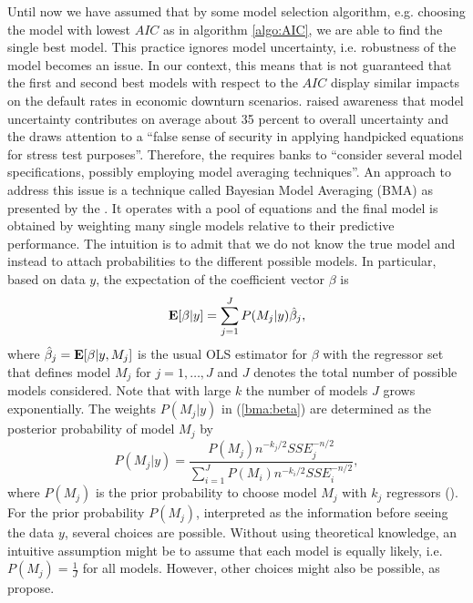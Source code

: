 \documentclass[a4paper, 12pt]{scrreprt}
\newcommand{\ew}{\mbox{\textbf{E}}}
\begin{document}
Until now we have assumed that by some model selection algorithm, e.g. choosing the model with lowest $AIC$ as in algorithm \ref{algo:AIC}, we are able to find the single best model. This practice ignores model uncertainty, i.e. robustness of the model becomes an issue. In our context, this means that is not guaranteed that the first and second best models with respect to the $AIC$ display similar impacts on the default rates in economic downturn scenarios. 
 \textcite{gross2017implications} raised awareness that model uncertainty contributes on average about 35 percent to overall uncertainty and the \textcite{ecb2015handpicked} draws attention to a ``false sense of security in applying handpicked equations for stress test purposes''.
 Therefore, the \textcite[chapter 
 2.3.1.5.v]{ecb2018srep} requires banks to ``consider several model specifications, possibly employing model averaging techniques''. An approach to address this issue is a technique called Bayesian Model Averaging (BMA) as presented by the \textcite[chapter 4.1]{ecb2017stampe}. 
It operates with a pool of equations and the final model is obtained by weighting many single models relative to their predictive performance.
The intuition is to admit that we do not know the true model and instead to attach probabilities to the different possible models.
In particular, based on data $y$, the expectation of the coefficient vector $\beta$ is 
\begin{equation}\label{bma:beta}
\ew[\beta | y] = \sum_{j=1}^{J} P(M_j | y) \hat{\beta}_j,
\end{equation}
where $\hat{\beta}_j = \ew[\beta | y, M_j]$ is the usual OLS estimator for $\beta$ with the regressor set that defines model $M_j$ for $j=1,\ldots,J$ and $J$ denotes the total number of possible models considered. Note that with large $k$ the number of models $J$ grows exponentially.
The weights $P(M_j | y)$ in (\ref{bma:beta}) are determined as the posterior probability of model $M_j$ by
\begin{equation}
P(M_j | y) = \frac{P(M_j) n^{-k_j/2} SSE_j^{-n/2}}{\sum_{i=1}^{J} P(M_i) n^{-k_i/2} SSE_i^{-n/2}},
\end{equation}
where $P(M_j)$ is the prior probability to choose model $M_j$ with $k_j$ regressors
(\textcite[chapter I.B]{doppelhofer2004determinants}).
For the prior probability $P(M_j)$, interpreted as the information before seeing the data $y$, several choices are possible. Without using theoretical knowledge, an intuitive assumption might be to assume that each model is equally likely, i.e. 
$P(M_j) = \frac{1}{J}$ for all models. However, other choices might also be possible, as \textcite[chapter 3]{figini2013credit} propose.
\end{document}
